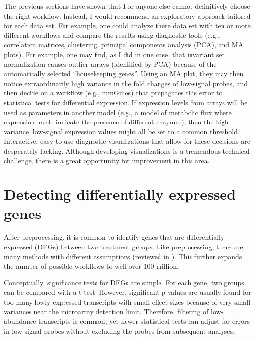 The previous sections have shown that I or anyone
else cannot definitively choose the right workflow. 
Instead, I would recommend an exploratory approach 
tailored for each data set.
For example, one could analyze there data set with ten 
or more different workflows and compare the results
using diagnostic tools (e.g., correlation matrices, clustering,
principal components analysis (PCA), and MA plots).
For example, one may find, as I did in one case, that invariant set
normalization causes outlier arrays (identified by PCA) because
of the automatically selected ``housekeeping genes''.
Using an MA plot, they may then notice extraordinarily
high variance in the fold changes of low-signal probes, and then decide
on a workflow (e.g., mmGmos) that propagates this error to
statistical tests for differential expression. If expression levels
from arrays will be used as parameters in another model (e.g., a model
of metabolic flux where expression levels indicate the presence of 
different enzymes), then the high-variance, low-signal expression values
might all be set to a common threshold.
Interactive, easy-to-use diagnostic visualizations that allow for these
decisions are desperately lacking.
Although developing visualizations is a tremendous technical challenge,
there is a great opportunity for improvement in this area.

\section[Differential expression]{Detecting differentially expressed genes}

After preprocessing, it is common to identify genes that are differentially
expressed (DEGs) between two treatment groups. Like preprocessing,
there are many methods with different assumptions (reviewed in
\cite{Cui:2003vl,Murie:2009dk,Storey:2003kd,Sreekumar:2008wj,
Pan:2002hy,Hong:2008hy,Yanofsky:2010by,Kadota:2011dz,Jeffery:2006bm}). This further expands
the number of possible workflows to well over 100 million.

Conceptually, significance tests for DEGs are simple.
For each gene, two groups can be compared with a t-test.
However, significant p-values are usually found for too many 
lowly expressed transcripts with small effect sizes because of very small
variances near the microarray detection limit.
Therefore, filtering of low-abundance transcripts is common, 
yet newer statistical tests can adjust for errors in low-signal probes
without excluding the probes from subsequent analyses.

